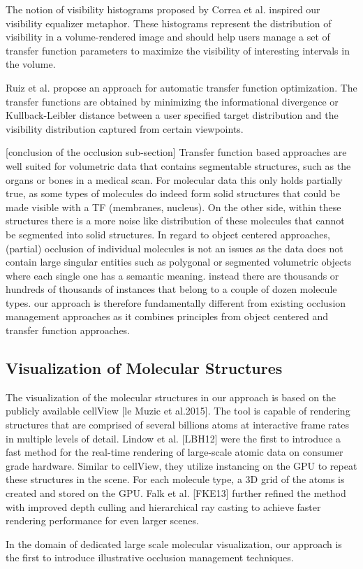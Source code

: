  The notion of visibility histograms proposed by Correa et al. inspired our visibility equalizer metaphor. These histograms represent the distribution of visibility in a volume-rendered image and should help users manage a set of transfer function parameters to maximize the visibility of interesting intervals in the volume.

Ruiz et al. propose an approach for automatic transfer function optimization. The transfer functions are obtained by minimizing the informational divergence or Kullback-Leibler distance between a user specified target distribution and the visibility distribution captured from certain viewpoints. 



[conclusion of the occlusion sub-section]
Transfer function based approaches are well suited for volumetric data that contains segmentable structures, such as the organs or bones in a medical scan. For molecular data this only holds partially true, as some types of molecules do indeed form solid structures that could be made visible with a TF (membranes, nucleus). 	On the other side, within these structures there is a more noise like distribution of these molecules that cannot be segmented into solid structures. 
In regard to object centered approaches, (partial) occlusion of individual molecules is not an issues as the data does not contain large singular entities such as polygonal or segmented volumetric objects where each single one has a semantic meaning. instead there are thousands or hundreds of thousands of instances that belong to a couple of dozen molecule types.
 our approach is therefore fundamentally different from existing occlusion management approaches as it combines principles from object centered and transfer function approaches. 


\subsection{Visualization of Molecular Structures}
The visualization of the molecular structures in our approach is based on the publicly available cellView [le Muzic et al.2015]. The tool is capable of rendering structures that are comprised of several billions atoms at interactive frame rates in multiple levels of detail.  
Lindow et al. [LBH12] were the ﬁrst to introduce a fast method for the real-time rendering of large-scale atomic data on consumer grade hardware. Similar to cellView, they utilize instancing on the GPU to repeat these structures in the scene. For each molecule type, a 3D grid of the atoms is created and stored on the GPU. Falk et al. [FKE13] further refined the method with improved depth culling and hierarchical ray casting to achieve faster rendering performance for even larger scenes. 

In the domain of dedicated large scale molecular visualization, our approach is the first to introduce illustrative occlusion management techniques.

	
\cite{Viola05}
\cite{Burns07}
\cite{Burns08}
\cite{Li07}
\cite{Lidal12}

